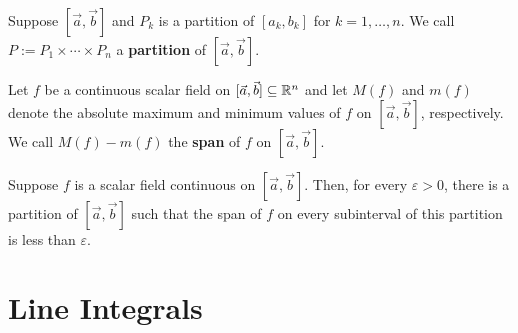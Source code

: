 \documentclass[a4paper]{ctexart}
\begin{document}
    \begin{mydef}
        Suppose $\left[ \vec a, \vec b \right]$ and $P_k$ is a partition of $[a_k, b_k]$ for $k=1, \ldots, n$. We call $P := P_1 \times \cdots \times P_n$ a \textbf{partition} of $[\vec a, \vec b]$. 
    \end{mydef}
    \begin{mydef}
        Let $f$ be a continuous scalar field on $[\vec a, \vec b] \subseteq \mathbb{R}^n$ and let $M(f)$ and $m(f)$ denote the absolute maximum and minimum values of $f$ on $[\vec a, \vec b]$, respectively. We call $M(f) - m(f)$ the \textbf{span} of $f$ on $[\vec a, \vec b]$.
    \end{mydef}
    \begin{mythm}
        Suppose $f$ is a scalar field continuous on $[\vec a, \vec b]$. Then, for every $\varepsilon > 0$, there is a partition of $[\vec a, \vec b]$ such that the span of $f$ on every subinterval of this partition is less than $\varepsilon$.
    \end{mythm}

    \newpage
    \section{Line Integrals}
\end{document}
